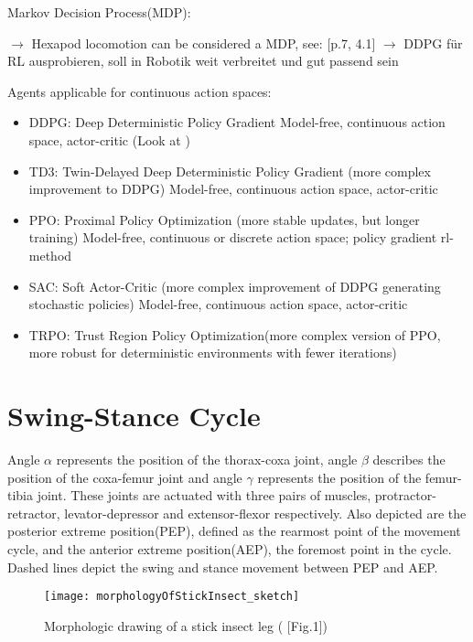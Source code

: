 Markov Decision Process(MDP):

$\rightarrow$ Hexapod locomotion can be considered a MDP, see: \parencite{ouyang2021adaptive} [p.7, 4.1]
$\rightarrow$ DDPG für RL ausprobieren, soll in Robotik weit verbreitet und gut passend sein \parencite{ouyang2021adaptive}


Agents applicable for continuous action spaces: 
\begin{itemize}		
	\item DDPG: Deep Deterministic Policy Gradient
	Model-free, continuous action space, actor-critic (Look at \parencite{trotta2022walking})
	\item TD3: Twin-Delayed Deep Deterministic Policy Gradient (more complex improvement to DDPG)
	Model-free, continuous action space, actor-critic
	\item PPO: Proximal Policy Optimization (more stable updates, but longer training)
	Model-free, continuous or discrete action space; policy gradient rl-method
	\item SAC: Soft Actor-Critic (more complex improvement of DDPG generating stochastic policies)
	Model-free, continuous action space, actor-critic
	\item TRPO: Trust Region Policy Optimization(more complex version of PPO, more robust for deterministic environments with fewer iterations)
\end{itemize}

\section{Swing-Stance Cycle}

Angle $\alpha$ represents the position of the thorax-coxa joint, angle $\beta$ describes the position of the coxa-femur joint and angle $\gamma$ represents the position of the femur-tibia joint.
These joints are actuated with three pairs of muscles, protractor-retractor, levator-depressor and extensor-flexor respectively.
Also depicted are the posterior extreme position(PEP), defined as the rearmost point of the movement cycle, and the anterior extreme position(AEP), the foremost point in the cycle.
Dashed lines depict the swing and stance movement between PEP and AEP.

\begin{figure}
	\centerline{\texttt{[image: morphologyOfStickInsect\_sketch]}}
	\caption{Morphologic drawing of a stick insect leg (\cite{schilling2013walknet} [Fig.1])}
	\label{Stick insect leg}
\end{figure}

